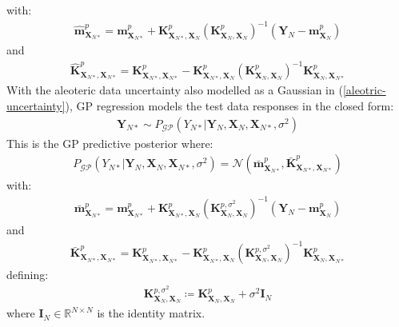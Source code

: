 \documentclass{article}
\newcommand{\GP}{\operatorname{\mathcal{GP}}}
\numberwithin{equation}{section}
\begin{document}
with:
\begin{align}
    \label{gp-epistemic-posterior-mean}
    \hat{\mathbf{m}}^p_{\mathbf{X}_{N*}} = \mathbf{m}^p_{\mathbf{X}_{N*}} + \mathbf{K}^p_{\mathbf{X}_{N*}, \mathbf{X}_N} \left(\mathbf{K}^p_{\mathbf{X}_N, \mathbf{X}_N}\right)^{-1} \left( \mathbf{Y}_N - \mathbf{m}^p_{\mathbf{X}_N}\right)
\end{align}
and
\begin{align}
    \label{gp-epistemic-posterior-covariance}
    \hat{\mathbf{K}}^p_{\mathbf{X}_{N*}, \mathbf{X}_{N*}} = \mathbf{K}^p_{\mathbf{X}_{N*}, \mathbf{X}_{N*}} - \mathbf{K}^p_{\mathbf{X}_{N*}, \mathbf{X}_N}\left(\mathbf{K}^p_{\mathbf{X}_N, \mathbf{X}_N}\right)^{-1}\mathbf{K}^p_{\mathbf{X}_N, \mathbf{X}_{N*}}
\end{align}
With the aleoteric data uncertainty also modelled as a Gaussian in (\ref{aleotric-uncertainty}), GP regression models the test data responses in the closed form:
\begin{align}
    \mathbf{Y}_{N*} \sim P_{\GP}\left(Y_{N*} \vert \mathbf{Y}_N, \mathbf{X}_N, \mathbf{X}_{N*}, \sigma^2\right)
    \label{gp-posterior}
\end{align}
This is the GP predictive posterior where:
\begin{align}
    P_{\GP}\left(Y_{N*} \vert \mathbf{Y}_N, \mathbf{X}_N, \mathbf{X}_{N*}, \sigma^2\right) = \mathcal{N}\left(\bar{\mathbf{m}}^p_{\mathbf{X}_{N*}}, \bar{\mathbf{K}}^p_{\mathbf{X}_{N*}, \mathbf{X}_{N*}}\right)
    \label{gp-posterior-normal}
\end{align}
with:
\begin{align}
    \label{gp-posterior-mean}
    \bar{\mathbf{m}}^p_{\mathbf{X}_{N*}} = \mathbf{m}^p_{\mathbf{X}_{N*}} + \mathbf{K}^p_{\mathbf{X}_{N*}, \mathbf{X}_N} \left( \mathbf{K}^{p, \sigma^2}_{\mathbf{X}_N, \mathbf{X}_N}\right)^{-1} \left( \mathbf{Y}_N - \mathbf{m}^p_{\mathbf{X}_N}\right)
\end{align}
and
\begin{align}
    \label{gp-posterior-covariance}
    \bar{\mathbf{K}}^p_{\mathbf{X}_{N*}, \mathbf{X}_{N*}} = \mathbf{K}^p_{\mathbf{X}_{N*}, \mathbf{X}_{N*}} - \mathbf{K}^p_{\mathbf{X}_{N*}, \mathbf{X}_N}\left( \mathbf{K}^{p, \sigma^2}_{\mathbf{X}_N, \mathbf{X}_N}\right)^{-1}\mathbf{K}^p_{\mathbf{X}_N, \mathbf{X}_{N*}}
\end{align}
defining:
\begin{align}
    \mathbf{K}^{p, \sigma^2}_{\mathbf{X}_N, \mathbf{X}_N} \coloneqq \mathbf{K}^p_{\mathbf{X}_N, \mathbf{X}_N} + \sigma^2 \mathbf{I}_N
    \label{gp-covariance-with-sigma}
\end{align}
where $\mathbf{I}_N \in \mathbb{R}^{N \times N}$ is the identity matrix.
\end{document}
